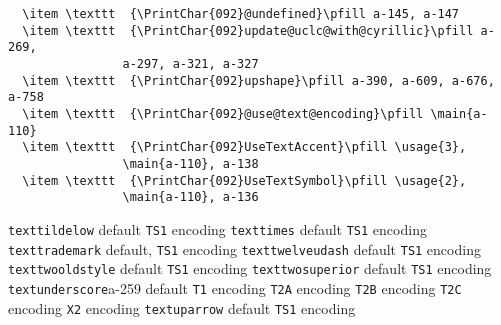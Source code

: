\documentclass[twoside]{ltxdoc}
\makeatletter
\renewenvironment{theindex}{%
   \@restonecoltrue
   \if@twocolumn\@restonecolfalse\fi
   \columnseprule \z@
   \columnsep 35\p@
   \twocolumn[\index@prologue]%
   \IndexParms
   \let\item\@idxitem
   \ignorespaces
}{\if@restonecol\onecolumn\else\clearpage\fi}
\makeatother
\begin{document}
\begin{theindex}
\begin{figure*}[tp]
\begin{verbatim}
  \item \texttt  {\PrintChar{092}@undefined}\pfill a-145, a-147
  \item \texttt  {\PrintChar{092}update@uclc@with@cyrillic}\pfill a-269, 
                a-297, a-321, a-327
  \item \texttt  {\PrintChar{092}upshape}\pfill a-390, a-609, a-676, a-758
  \item \texttt  {\PrintChar{092}@use@text@encoding}\pfill \main{a-110}
  \item \texttt  {\PrintChar{092}UseTextAccent}\pfill \usage{3}, 
                \main{a-110}, a-138
  \item \texttt  {\PrintChar{092}UseTextSymbol}\pfill \usage{2}, 
                \main{a-110}, a-136
\end{verbatim}
  \end{figure*}
  \item \texttt  {texttildelow}\efill 
    \subitem default\pfill {}
    \subitem \texttt  {TS1} encoding\pfill {}
  \item \texttt  {texttimes}\efill 
    \subitem default\pfill {}
    \subitem \texttt  {TS1} encoding\pfill {}
  \item \texttt  {texttrademark}\efill 
    \subitem default\pfill {}, 
    \subitem \texttt  {TS1} encoding\pfill {}
  \item \texttt  {texttwelveudash}\efill 
    \subitem default\pfill {}
    \subitem \texttt  {TS1} encoding\pfill {}
  \item \texttt  {texttwooldstyle}\efill 
    \subitem default\pfill {}
    \subitem \texttt  {TS1} encoding\pfill {}
  \item \texttt  {texttwosuperior}\efill 
    \subitem default\pfill {}
    \subitem \texttt  {TS1} encoding\pfill {}
  \item \texttt  {textunderscore}\pfill a-259
    \subitem default\pfill {}
    \subitem \texttt  {T1} encoding\pfill {}
    \subitem \texttt  {T2A} encoding\pfill {}
    \subitem \texttt  {T2B} encoding\pfill {}
    \subitem \texttt  {T2C} encoding\pfill {}
    \subitem \texttt  {X2} encoding\pfill {}
  \item \texttt  {textuparrow}\efill 
    \subitem default\pfill {}
    \subitem \texttt  {TS1} encoding\pfill {}

\end{theindex}
\end{document}
